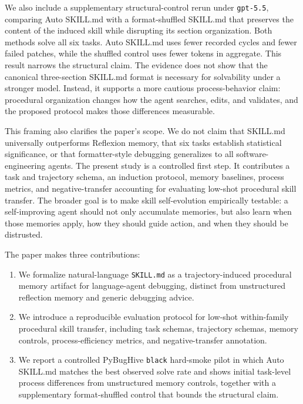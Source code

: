 We also include a supplementary structural-control rerun under \texttt{gpt-5.5}, comparing Auto SKILL.md with a format-shuffled SKILL.md that preserves the content of the induced skill while disrupting its section organization. Both methods solve all six tasks. Auto SKILL.md uses fewer recorded cycles and fewer failed patches, while the shuffled control uses fewer tokens in aggregate. This result narrows the structural claim. The evidence does not show that the canonical three-section SKILL.md format is necessary for solvability under a stronger model. Instead, it supports a more cautious process-behavior claim: procedural organization changes how the agent searches, edits, and validates, and the proposed protocol makes those differences measurable.

This framing also clarifies the paper's scope. We do not claim that SKILL.md universally outperforms Reflexion memory, that six tasks establish statistical significance, or that formatter-style debugging generalizes to all software-engineering agents. The present study is a controlled first step. It contributes a task and trajectory schema, an induction protocol, memory baselines, process metrics, and negative-transfer accounting for evaluating low-shot procedural skill transfer. The broader goal is to make skill self-evolution empirically testable: a self-improving agent should not only accumulate memories, but also learn when those memories apply, how they should guide action, and when they should be distrusted.

The paper makes three contributions:
\begin{enumerate}
\item We formalize natural-language \texttt{SKILL.md} as a trajectory-induced procedural memory artifact for language-agent debugging, distinct from unstructured reflection memory and generic debugging advice.
\item We introduce a reproducible evaluation protocol for low-shot within-family procedural skill transfer, including task schemas, trajectory schemas, memory controls, process-efficiency metrics, and negative-transfer annotation.
\item We report a controlled PyBugHive \texttt{black} hard-smoke pilot in which Auto SKILL.md matches the best observed solve rate and shows initial task-level process differences from unstructured memory controls, together with a supplementary format-shuffled control that bounds the structural claim.
\end{enumerate}
